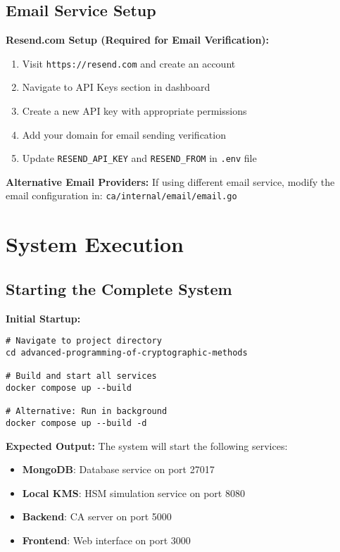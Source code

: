 \subsection{Email Service Setup}

\textbf{Resend.com Setup (Required for Email Verification):}
\begin{enumerate}
    \item Visit \texttt{https://resend.com} and create an account
    \item Navigate to API Keys section in dashboard
    \item Create a new API key with appropriate permissions
    \item Add your domain for email sending verification
    \item Update \texttt{RESEND\_API\_KEY} and \texttt{RESEND\_FROM} in \texttt{.env} file
\end{enumerate}

\textbf{Alternative Email Providers:}
If using different email service, modify the email configuration in:
\texttt{ca/internal/email/email.go}

\section{System Execution}

\subsection{Starting the Complete System}

\textbf{Initial Startup:}
\begin{verbatim}
# Navigate to project directory
cd advanced-programming-of-cryptographic-methods

# Build and start all services
docker compose up --build

# Alternative: Run in background
docker compose up --build -d
\end{verbatim}

\textbf{Expected Output:}
The system will start the following services:
\begin{itemize}
    \item \textbf{MongoDB}: Database service on port 27017
    \item \textbf{Local KMS}: HSM simulation service on port 8080
    \item \textbf{Backend}: CA server on port 5000
    \item \textbf{Frontend}: Web interface on port 3000
\end{itemize}


